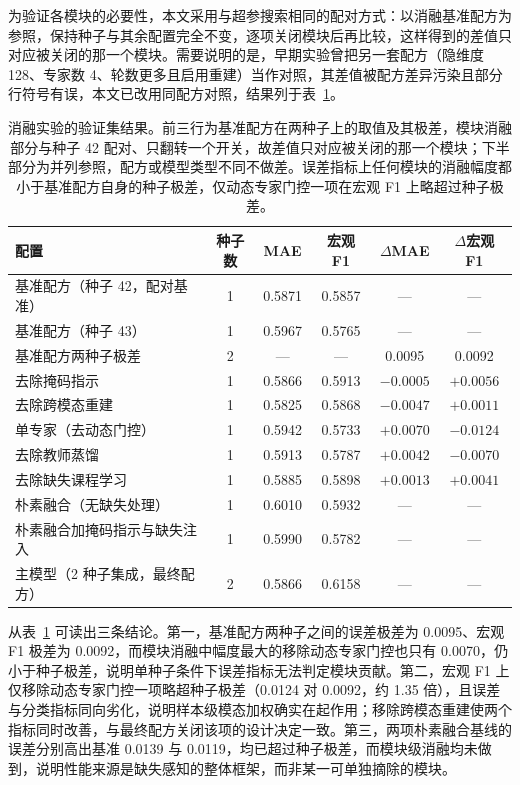 \documentclass[withoutpreface,bwprint]{cumcmthesis}
\begin{document}
为验证各模块的必要性，本文采用与超参搜索相同的配对方式：以消融基准配方为参照，保持种子与其余配置完全不变，逐项关闭模块后再比较，这样得到的差值只对应被关闭的那一个模块。需要说明的是，早期实验曾把另一套配方（隐维度 128、专家数 4、轮数更多且启用重建）当作对照，其差值被配方差异污染且部分行符号有误，本文已改用同配方对照，结果列于表~\ref{tab:ablation}。

\begin{table}[H]
\centering
  \caption{消融实验的验证集结果。前三行为基准配方在两种子上的取值及其极差，模块消融部分与种子 42 配对、只翻转一个开关，故差值只对应被关闭的那一个模块；下半部分为并列参照，配方或模型类型不同不做差。误差指标上任何模块的消融幅度都小于基准配方自身的种子极差，仅动态专家门控一项在宏观 F1 上略超过种子极差。}
\label{tab:ablation}
\small
\begin{tabular}{@{}lccccc@{}}
\toprule
配置 & 种子数 & MAE & 宏观 F1 & $\Delta$MAE & $\Delta$宏观 F1 \\
\midrule
基准配方（种子 42，配对基准） & 1 & 0.5871 & 0.5857 & --- & --- \\
基准配方（种子 43） & 1 & 0.5967 & 0.5765 & --- & --- \\
基准配方两种子极差 & 2 & --- & --- & 0.0095 & 0.0092 \\
\midrule
去除掩码指示 & 1 & 0.5866 & 0.5913 & $-0.0005$ & $+0.0056$ \\
去除跨模态重建 & 1 & 0.5825 & 0.5868 & $-0.0047$ & $+0.0011$ \\
单专家（去动态门控） & 1 & 0.5942 & 0.5733 & $+0.0070$ & $-0.0124$ \\
去除教师蒸馏 & 1 & 0.5913 & 0.5787 & $+0.0042$ & $-0.0070$ \\
去除缺失课程学习 & 1 & 0.5885 & 0.5898 & $+0.0013$ & $+0.0041$ \\
\midrule
朴素融合（无缺失处理） & 1 & 0.6010 & 0.5932 & --- & --- \\
朴素融合加掩码指示与缺失注入 & 1 & 0.5990 & 0.5782 & --- & --- \\
主模型（2 种子集成，最终配方） & 2 & 0.5866 & 0.6158 & --- & --- \\
\bottomrule
\end{tabular}
\end{table}

从表~\ref{tab:ablation} 可读出三条结论。第一，基准配方两种子之间的误差极差为 0.0095、宏观 F1 极差为 0.0092，而模块消融中幅度最大的移除动态专家门控也只有 0.0070，仍小于种子极差，说明单种子条件下误差指标无法判定模块贡献。第二，宏观 F1 上仅移除动态专家门控一项略超种子极差（0.0124 对 0.0092，约 1.35 倍），且误差与分类指标同向劣化，说明样本级模态加权确实在起作用；移除跨模态重建使两个指标同时改善，与最终配方关闭该项的设计决定一致。第三，两项朴素融合基线的误差分别高出基准 0.0139 与 0.0119，均已超过种子极差，而模块级消融均未做到，说明性能来源是缺失感知的整体框架，而非某一可单独摘除的模块。
\end{document}
